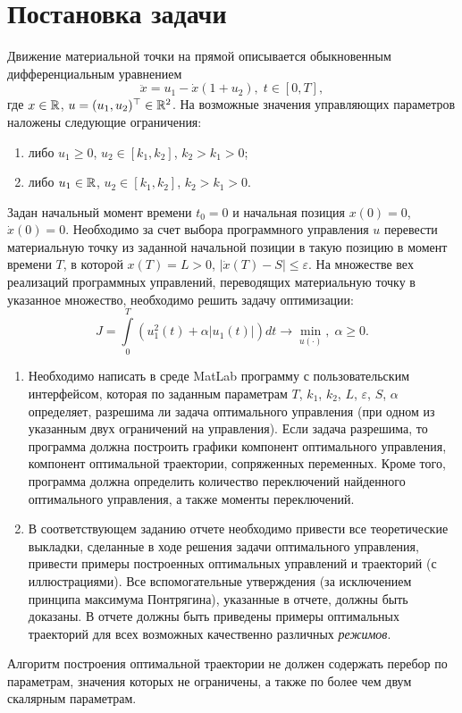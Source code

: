 \section{Постановка задачи}

Движение материальной точки на прямой описывается обыкновенным дифференциальным уравнением
\begin{equation} \label{eq:main_equation}
        \ddot x = u_1 - \dot x (1 + u_2), \; t \in [0, T],
\end{equation}
где $x \in \mathbb{R}$, $u = (u_1, u_2)^\top \in \mathbb{R}^2$. На возможные значения управляющих параметров наложены следующие ограничения:
\begin{enumerate}
        \item либо $u_1 \geqslant 0$, $u_2 \in [k_1, k_2]$, $k_2 > k_1 > 0$;
        \item либо $u_1 \in \mathbb{R}$, $u_2 \in [k_1, k_2]$, $k_2 > k_1 > 0$.
\end{enumerate}
Задан начальный момент времени $t_0 = 0$ и начальная позиция $x(0) = 0$, $\dot x(0) = 0$. Необходимо за счет выбора программного управления $u$ перевести материальную точку из заданной начальной позиции в такую позицию в момент времени $T$, в которой $x(T) = L > 0$, $|\dot x(T) - S| \leqslant \varepsilon$. На множестве вех реализаций программных управлений, переводящих материальную точку в указанное множество, необходимо решить задачу оптимизации:
$$
        J = \int\limits_0^T \left( u_1^2(t) + \alpha |u_1(t)| \right) dt \to \min\limits_{u(\cdot)}, \; \alpha \geqslant 0.
$$
\begin{enumerate}
        \item Необходимо написать в среде MatLab программу с пользовательским интерфейсом, которая по заданным параметрам $T$, $k_1$, $k_2$, $L$, $\varepsilon$, $S$, $\alpha$ определяет, разрешима ли задача оптимального управления (при одном из указанным двух ограничений на управления). Если задача разрешима, то программа должна построить графики компонент оптимального управления, компонент оптимальной траектории, сопряженных переменных. Кроме того, программа должна определить количество переключений найденного оптимального управления, а также моменты переключений.
        \item В соответствующем заданию отчете необходимо привести все теоретические выкладки, сделанные в ходе решения задачи оптимального управления, привести примеры построенных оптимальных управлений и траекторий (с иллюстрациями). Все вспомогательные утверждения (за исключением принципа максимума Понтрягина), указанные в отчете, должны быть доказаны. В отчете должны быть приведены примеры оптимальных траекторий для всех возможных качественно различных \textit{режимов}.
\end{enumerate}
\begin{remark}
        Алгоритм построения оптимальной траектории не должен содержать перебор по параметрам, значения которых не ограничены, а также по более чем двум скалярным параметрам.
\end{remark}